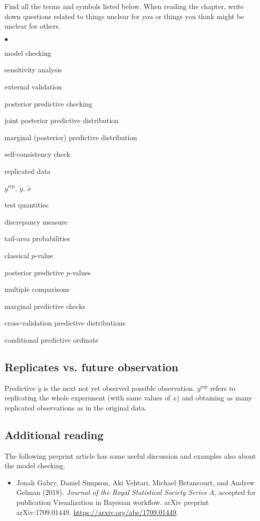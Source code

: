 \documentclass[a4paper,11pt,english]{article}
\DeclareMathOperator{\rep}{\mathrm{rep}}
\begin{document}
Find all the terms and symbols listed below. When reading the chapter,
write down questions related to things unclear for you or things you
think might be unclear for others.
\begin{list}{$\bullet$}{\parsep=0pt\itemsep=2pt}
\item model checking
\item sensitivity analysis
\item external validation
\item posterior predictive checking
\item joint posterior predictive distribution
\item marginal (posterior) predictive distribution
\item self-consistency check
\item replicated data
\item $y^{\rep}$, $\tilde{y}$, $\tilde{x}$
\item test quantities
\item discrepancy measure
\item tail-area probabilities
\item classical $p$-value
\item posterior predictive $p$-values
\item multiple comparisons
\item marginal predictive checks
\item cross-validation predictive distributions
\item conditional predictive ordinate
\end{list}

 \subsection*{Replicates vs. future observation}

 Predictive $\tilde{y}$ is the next not yet observed possible
 observation. $y^{\mathrm{rep}}$ refers to replicating the whole
 experiment (with same values of $x$) and obtaining as many replicated
 observations as in the original data.

 \subsection*{Additional reading}

 The following preprint article has some useful discussion and examples also about the model checking.
\begin{itemize}
\item  Jonah Gabry, Daniel Simpson, Aki Vehtari, Michael Betancourt, and Andrew Gelman (2018). {\em Journal of the Royal Statistical Society Series A}, accepted for publication Visualization in Bayesian workflow. arXiv preprint arXiv:1709.01449. \url{https://arxiv.org/abs/1709.01449}.
\end{itemize}
\end{document}

